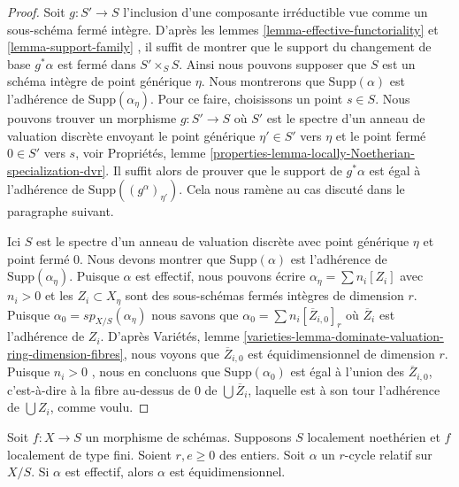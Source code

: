 \begin{proof} 
Soit  $g : S' \to S$  l'inclusion d'une composante irréductible vue 
comme un sous-schéma fermé intègre. D'après les 
lemmes  \ref{lemma-effective-functoriality}  et  \ref{lemma-support-family} ,
 il suffit de montrer que le support du changement de base  
$g^*\alpha$  est fermé dans $S' \times_S S$. 
Ainsi nous pouvons supposer que  $S$  est un schéma intègre de point générique  
$\eta$. Nous montrerons que  $\text{Supp}(\alpha)$  est l'adhérence 
de  $\text{Supp}(\alpha_\eta)$. Pour ce faire, choisissons un point  $s \in S$. 
Nous pouvons trouver un morphisme  $g : S' \to S$  où  $S'$  est le spectre 
d'un anneau de valuation discrète envoyant le point générique  $\eta' \in S'$  vers $\eta$
  et le point fermé  $0 \in S'$  vers  $s$, voir
 Propriétés, lemme \ref{properties-lemma-locally-Noetherian-specialization-dvr}. 
Il suffit alors de prouver que le support de  $g^*\alpha$
  est égal à l'adhérence de  $\text{Supp}((g^\alpha)_{\eta'})$.
 Cela nous ramène au cas discuté dans le paragraphe suivant. 

\medskip\noindent
 Ici  $S$  est le spectre d'un anneau de valuation discrète avec point 
générique  $\eta$  et point fermé  $0$. Nous devons montrer que 
$\text{Supp}(\alpha)$  est l'adhérence de  $\text{Supp}(\alpha_\eta)$. 
Puisque  $\alpha$  est effectif, nous pouvons écrire  $\alpha_\eta = \sum n_i[Z_i]$
  avec  $n_i > 0$  et les  $Z_i \subset X_\eta$ sont des sous-schémas fermés intègres de dimension  $r$. 
Puisque  $\alpha_0 = sp_{X/S}(\alpha_\eta)$  nous savons que 
$\alpha_0 = \sum n_i [\overline{Z}_{i, 0}]_r$  où  $\overline{Z}_i$
  est l'adhérence de  $Z_i$. D'après Variétés, lemme 
\ref{varieties-lemma-dominate-valuation-ring-dimension-fibres}, nous
 voyons que  $\overline{Z}_{i, 0}$  est équidimensionnel de dimension $r$. 
Puisque  $n_i > 0$ , nous en concluons que  $\text{Supp}(\alpha_0)$
  est égal à l'union des  $\overline{Z}_{i, 0}$, c'est-à-dire
 à la fibre au-dessus de  $0$  de $\bigcup \overline{Z}_i$, laquelle
 est à son tour l'adhérence de  $\bigcup Z_i$, comme voulu. 
\end{proof} 

\begin{lemma} 
\label{lemma-effective-equidimensional} 
Soit  $f : X \to S$  un morphisme de schémas. Supposons  $S$  localement noethérien
 et  $f$  localement de type fini. Soient  $r, e \geq 0$  des entiers. 
Soit  $\alpha$  un  $r$-cycle relatif sur  $X/S$.
 Si $\alpha$  est effectif, alors  $\alpha$  est équidimensionnel. 
\end{lemma} 

